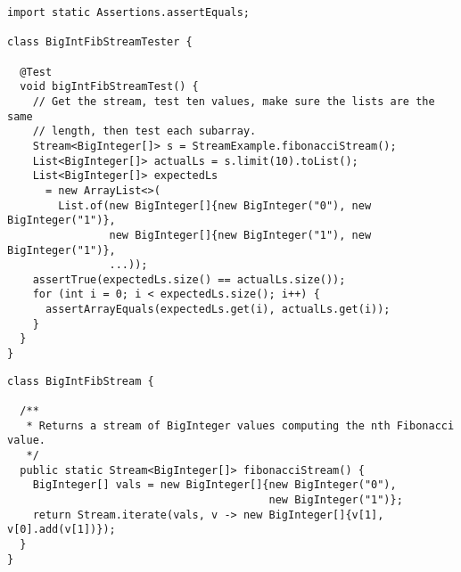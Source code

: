 \begin{cl}[]{}
\begin{lstlisting}[language=MyJava]
import static Assertions.assertEquals;

class BigIntFibStreamTester {

  @Test
  void bigIntFibStreamTest() {
    // Get the stream, test ten values, make sure the lists are the same
    // length, then test each subarray.
    Stream<BigInteger[]> s = StreamExample.fibonacciStream();
    List<BigInteger[]> actualLs = s.limit(10).toList();
    List<BigInteger[]> expectedLs 
      = new ArrayList<>(
        List.of(new BigInteger[]{new BigInteger("0"), new BigInteger("1")},
                new BigInteger[]{new BigInteger("1"), new BigInteger("1")},
                ...));
    assertTrue(expectedLs.size() == actualLs.size());
    for (int i = 0; i < expectedLs.size(); i++) {
      assertArrayEquals(expectedLs.get(i), actualLs.get(i));
    }
  }
}
\end{lstlisting}
\end{cl}

\begin{cl}[]{}
\begin{lstlisting}[language=MyJava]
class BigIntFibStream {

  /**
   * Returns a stream of BigInteger values computing the nth Fibonacci value.
   */
  public static Stream<BigInteger[]> fibonacciStream() {
    BigInteger[] vals = new BigInteger[]{new BigInteger("0"), 
                                         new BigInteger("1")};
    return Stream.iterate(vals, v -> new BigInteger[]{v[1], v[0].add(v[1])});
  }
}
\end{lstlisting}
\end{cl}

